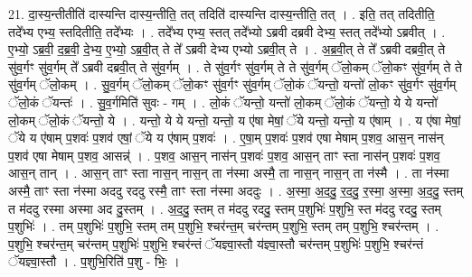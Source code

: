 \documentclass[17pt]{extarticle}
\begin{document}
21. दा॒स्य॒न्तीतीति॑ दास्यन्ति दास्य॒न्तीति॒ तत् तदिति॑ दास्यन्ति दास्य॒न्तीति॒ तत् । . इति॒ तत् तदितीति॒ तदे᳚भ्य एभ्य॒ स्तदितीति॒ तदे᳚भ्यः । . तदे᳚भ्य एभ्य॒ स्तत् तदे᳚भ्यो ऽब्रवी दब्रवी देभ्य॒ स्तत् तदे᳚भ्यो ऽब्रवीत् । . ए॒भ्यो॒ ऽब्र॒वी॒ द॒ब्र॒वी॒ दे॒भ्य॒ ए॒भ्यो॒ ऽब्र॒वी॒त् ते ते᳚ ऽब्रवी देभ्य एभ्यो ऽब्रवी॒त् ते । . अ॒ब्र॒वी॒त् ते ते᳚ ऽब्रवी दब्रवी॒त् ते सु॑व॒र्गꣳ सु॑व॒र्गम् ते᳚ ऽब्रवी दब्रवी॒त् ते सु॑व॒र्गम् । . ते सु॑व॒र्गꣳ सु॑व॒र्गम् ते ते सु॑व॒र्गम् ॅलो॒कम् ॅलो॒कꣳ सु॑व॒र्गम् ते ते सु॑व॒र्गम् ॅलो॒कम् । . सु॒व॒र्गम् ॅलो॒कम् ॅलो॒कꣳ सु॑व॒र्गꣳ सु॑व॒र्गम् ॅलो॒कं ॅयन्तो॒ यन्तो॑ लो॒कꣳ सु॑व॒र्गꣳ सु॑व॒र्गम् ॅलो॒कं ॅयन्तः॑ । . सु॒व॒र्गमिति॑ सुवः - गम् । . लो॒कं ॅयन्तो॒ यन्तो॑ लो॒कम् ॅलो॒कं ॅयन्तो॒ ये ये यन्तो॑ लो॒कम् ॅलो॒कं ॅयन्तो॒ ये । . यन्तो॒ ये ये यन्तो॒ यन्तो॒ य ए॑षा मेषां॒ ॅये यन्तो॒ यन्तो॒ य ए॑षाम् । . य ए॑षा मेषां॒ ॅये य ए॑षाम् प॒शवः॑ प॒शव॑ एषां॒ ॅये य ए॑षाम् प॒शवः॑ । . ए॒षा॒म् प॒शवः॑ प॒शव॑ एषा मेषाम् प॒शव॒ आस॒न् नास॑न् प॒शव॑ एषा मेषाम् प॒शव॒ आसन्न्॑ । . प॒शव॒ आस॒न् नास॑न् प॒शवः॑ प॒शव॒ आस॒न् ताꣳ स्ता नास॑न् प॒शवः॑ प॒शव॒ आस॒न् तान् । . आस॒न् ताꣳ स्ता नास॒न् नास॒न् ता न॑स्मा अस्मै॒ ता नास॒न् नास॒न् ता न॑स्मै । . ता न॑स्मा अस्मै॒ ताꣳ स्ता न॑स्मा अददु रददु रस्मै॒ ताꣳ स्ता न॑स्मा अददुः । . अ॒स्मा॒ अ॒द॒दु॒ र॒द॒दु॒ र॒स्मा॒ अ॒स्मा॒ अ॒द॒दु॒ स्तम् त म॑ददु रस्मा अस्मा अद दु॒स्तम् । . अ॒द॒दु॒ स्तम् त म॑ददु रददु॒ स्तम् प॒शुभिः॑ प॒शुभि॒ स्त म॑ददु रददु॒ स्तम् प॒शुभिः॑ । . तम् प॒शुभिः॑ प॒शुभि॒ स्तम् तम् प॒शुभि॒ श्चर॑न्त॒म् चर॑न्तम् प॒शुभि॒ स्तम् तम् प॒शुभि॒ श्चर॑न्तम् । . प॒शुभि॒ श्चर॑न्त॒म् चर॑न्तम् प॒शुभिः॑ प॒शुभि॒ श्चर॑न्तं ॅयज्ञ्वा॒स्तौ य॑ज्ञ्वा॒स्तौ चर॑न्तम् प॒शुभिः॑ प॒शुभि॒ श्चर॑न्तं ॅयज्ञ्वा॒स्तौ । . प॒शुभि॒रिति॑ प॒शु - भिः॒ । \newline
\end{document}
